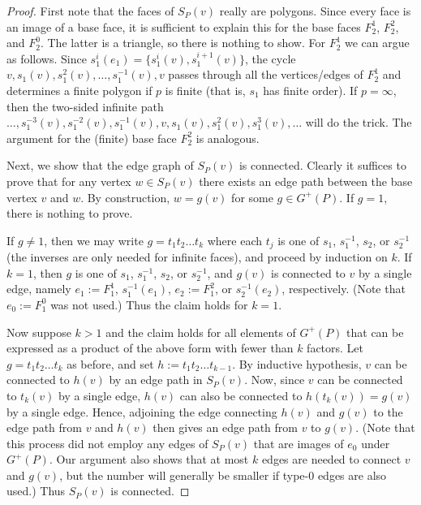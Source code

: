 \documentclass[10pt,a4paper]{amsart}
\begin{document}
\begin{proof} 
First note that the faces of ${S}_P(v)$ really are polygons. Since every face is an image of a base face, it is sufficient to explain this for the base faces $F_2^1$, $F_2^2$, and $F_2^0$. The latter is a triangle, so there is nothing to show. For $F_2^1$ we can argue as follows. Since $s_1^i(e_1) = \{s_1^i(v), s_1^{i+1}(v)\}$, the cycle $v, s_1(v), s_1^2(v), \dots , s_1^{-1}(v), v$ passes through all the vertices/edges of $F_2^{1}$ and determines a finite polygon if $p$ is finite (that is, $s_1$ has finite order). If $p=\infty$, then the two-sided infinite path $\dots,s_1^{-3}(v), s_1^{-2}(v), s_1^{-1}(v),v,s_1(v),s_1^2(v),s_1^3(v),\dots$ will do the trick. The argument for the (finite) base face $F_2^{2}$ is analogous. 

Next, we show that the edge graph of ${S}_P(v)$ is connected. Clearly it suffices to prove that for any vertex $w \in {S}_P(v)$ there exists an edge path between the base vertex $v$ and $w$. By construction, $w=g(v)$ for some $g \in G^+(P)$. If $g=1$, there is nothing to prove. 

If $g\neq 1$, then we may write $g = t_{1}t_{2}\ldots t_{k}$ where each $t_j$ is one of $s_1$, $s_1^{-1}$, $s_2$, or $s_2^{-1}$ (the inverses are only needed for infinite faces), and proceed by induction on $k$. If $k=1$, then $g$ is one of $s_1$, $s_1^{-1}$, $s_2$, or $s_2^{-1}$, and $g(v)$ is connected to $v$ by a single edge, namely $e_{1}:=F_{1}^{1}$, $s_{1}^{-1}(e_{1})$, $e_{2}:=F_{1}^{2}$, or $s_{2}^{-1}(e_{2})$, respectively. (Note that $e_0:=F_{1}^{0}$ was not used.) Thus the claim holds for $k=1$. 

Now suppose $k>1$ and the claim holds for all elements of $G^+(P)$ that can be expressed as a product of the above form with fewer than $k$ factors. Let $g = t_{1}t_{2}\ldots t_{k}$ as before, and set $h :=t_{1}t_{2}\ldots t_{k-1}$. By inductive hypothesis, $v$ can be connected to $h(v)$ by an edge path in ${S}_P(v)$. Now, since $v$ can be connected to $t_{k}(v)$ by a single edge, $h(v)$ can also be connected to $h(t_{k}(v))=g(v)$ by a single edge. Hence, adjoining the edge connecting $h(v)$ and $g(v)$ to the edge path from $v$ and $h(v)$ then gives an edge path from $v$ to $g(v)$. (Note that this process did not employ any edges of ${S}_P(v)$ that are images of $e_0$ under $G^{+}(P)$. Our argument also shows that at most $k$ edges are needed to connect $v$ and $g(v)$, but the number will generally be smaller if type-0 edges are also used.) Thus ${S}_P(v)$ is connected. \smallskip


\end{proof}
\end{document}
